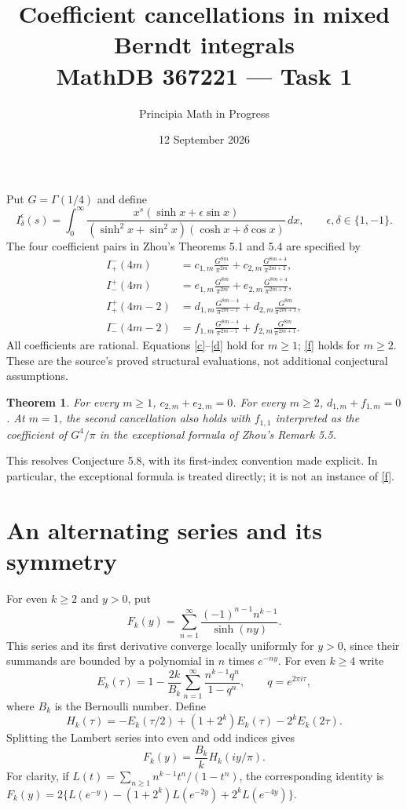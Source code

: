 \documentclass[11pt]{article}
\title{Coefficient cancellations in mixed Berndt integrals\\
\large MathDB 367221 --- Task 1}
\author{Principia Math in Progress}
\date{12 September 2026}
\newtheorem{theorem}{Theorem}
\newcommand{\G}{\Gamma(1/4)}
\begin{document}
\maketitle

Put $G=\G$ and define
\[
 I_\delta^\epsilon(s)=\int_0^\infty
 \frac{x^s(\sinh x+\epsilon\sin x)}
 {(\sinh^2x+\sin^2x)(\cosh x+\delta\cos x)}\,dx,
 \qquad \epsilon,\delta\in\{1,-1\}.
\]
The four coefficient pairs in Zhou's Theorems 5.1 and 5.4
\cite{Zhou} are specified by
\begin{align}
 I_+^-(4m)&=c_{1,m}\frac{G^{8m}}{\pi^{2m}}
                  +c_{2,m}\frac{G^{8m+4}}{\pi^{2m+2}},\label{c}\\
 I_-^+(4m)&=e_{1,m}\frac{G^{8m}}{\pi^{2m}}
                  +e_{2,m}\frac{G^{8m+4}}{\pi^{2m+2}},\label{e}\\
 I_+^+(4m-2)&=d_{1,m}\frac{G^{8m-4}}{\pi^{2m-1}}
                  +d_{2,m}\frac{G^{8m}}{\pi^{2m+1}},\label{d}\\
 I_-^-(4m-2)&=f_{1,m}\frac{G^{8m-4}}{\pi^{2m-1}}
                  +f_{2,m}\frac{G^{8m}}{\pi^{2m+1}}.\label{f}
\end{align}
All coefficients are rational. Equations \eqref{c}--\eqref{d} hold for
$m\geq1$; \eqref{f} holds for $m\geq2$. These are the source's
proved structural evaluations, not additional conjectural assumptions.

\begin{theorem}\label{main}
For every $m\geq1$, $c_{2,m}+e_{2,m}=0$. For every $m\geq2$,
$d_{1,m}+f_{1,m}=0$. At $m=1$, the second cancellation also holds
with $f_{1,1}$ interpreted as the coefficient of $G^4/\pi$
in the exceptional formula of Zhou's Remark 5.5.
\end{theorem}
This resolves Conjecture 5.8, with its first-index convention made
explicit. In particular, the exceptional formula is treated directly;
it is not an instance of \eqref{f}.

\section*{An alternating series and its symmetry}
For even $k\geq2$ and $y>0$, put
\[
 F_k(y)=\sum_{n=1}^\infty
 \frac{(-1)^{n-1}n^{k-1}}{\sinh(ny)}.
\]
This series and its first derivative converge locally uniformly for
$y>0$, since their summands are bounded by a polynomial in $n$
times $e^{-ny}$. For even $k\geq4$ write
\[
 E_k(\tau)=1-\frac{2k}{B_k}\sum_{n=1}^\infty
 \frac{n^{k-1}q^n}{1-q^n},\qquad q=e^{2\pi i\tau},
\]
where $B_k$ is the Bernoulli number. Define
\[
 H_k(\tau)=-E_k(\tau/2)+(1+2^k)E_k(\tau)-2^kE_k(2\tau).
\]
Splitting the Lambert series into even and odd indices gives
\begin{equation}
 F_k(y)=\frac{B_k}{k}H_k(iy/\pi).                 \label{lambert}
\end{equation}
For clarity, if $L(t)=\sum_{n\geq1}n^{k-1}t^n/(1-t^n)$,
the corresponding identity is
$F_k(y)=2\{L(e^{-y})-(1+2^k)L(e^{-2y})+2^kL(e^{-4y})\}$.
\end{document}
